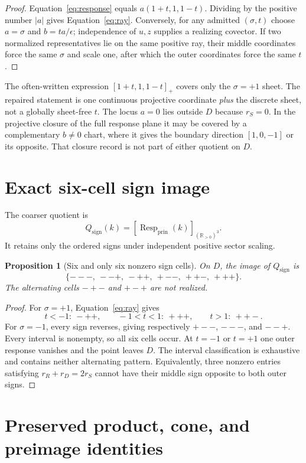 \documentclass[11pt]{article}
\newtheorem{proposition}{Proposition}
\newcommand{\RR}{\mathbb R}
\newcommand{\Resp}{\operatorname{Resp}_{\mathrm{prin}}}
\newcommand{\Qsign}{Q_{\mathrm{sign}}}
\begin{document}
\begin{proof}
Equation~\eqref{eq:response} equals
$a(1+t,1,1-t)$.  Dividing by the positive number $|a|$ gives
Equation~\eqref{eq:ray}.  Conversely, for any admitted $(\sigma,t)$ choose
$a=\sigma$ and $b=ta/\epsilon$; independence of $u,z$ supplies a realizing
covector.  If two normalized representatives lie on the same positive ray,
their middle coordinates force the same $\sigma$ and scale one, after which
the outer coordinates force the same $t$.
\end{proof}

The often-written expression $[1+t,1,1-t]_+$ covers only the
$\sigma=+1$ sheet.  The repaired statement is one continuous projective
coordinate \emph{plus} the discrete sheet, not a globally sheet-free $t$.
The locus $a=0$ lies outside $D$ because $r_S=0$.  In the projective closure of
the full response plane it may be covered by a complementary $b\ne0$ chart,
where it gives the boundary direction $[1,0,-1]$ or its opposite.  That closure
record is not part of either quotient on $D$.

\section{Exact six-cell sign image}

The coarser quotient is
\[
 \Qsign(k)=[\Resp(k)]_{(\RR_{>0})^3}.
\]
It retains only the ordered signs under independent positive sector scaling.

\begin{proposition}[Six and only six nonzero sign cells]
On $D$, the image of $\Qsign$ is
\[
 \{---,\ --+,\ -++,\ +--,\ ++-,\ +++\}.
\]
The alternating cells $-+-$ and $+-+$ are not realized.
\end{proposition}

\begin{proof}
For $\sigma=+1$, Equation~\eqref{eq:ray} gives
\[
 t<-1:\ -++,\qquad -1<t<1:\ +++,\qquad t>1:\ ++-.
\]
For $\sigma=-1$, every sign reverses, giving respectively
$+--$, $---$, and $--+$.  Every interval is nonempty, so all six cells occur.
At $t=-1$ or $t=+1$ one outer response vanishes and the point leaves $D$.
The interval classification is exhaustive and contains neither alternating
pattern.  Equivalently, three nonzero entries satisfying
$r_R+r_D=2r_S$ cannot have their middle sign opposite to both outer signs.
\end{proof}

\section{Preserved product, cone, and preimage identities}
\end{document}

